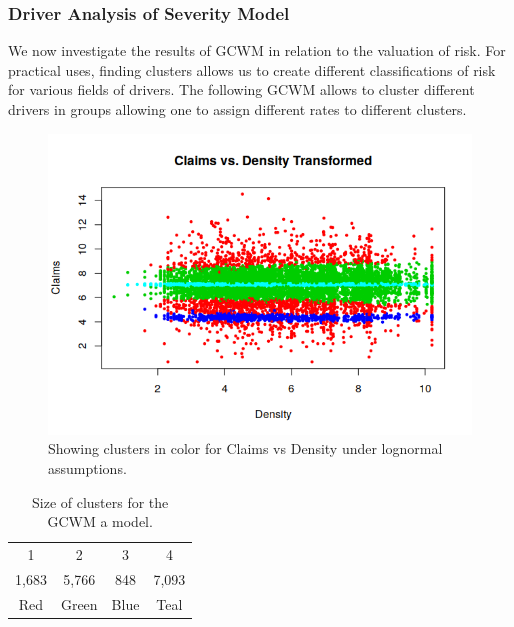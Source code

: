\documentclass[11pt,letterpaper]{article}
\numberwithin{equation}{section}
\numberwithin{equation}{section}
\numberwithin{equation}{section}
\begin{document}
\subsubsection{Driver Analysis of Severity Model}

	We now investigate the results of GCWM in relation to the valuation of risk. For practical uses, finding clusters allows us to create different classifications of risk for various fields of drivers. The following GCWM allows to cluster different drivers in groups allowing one to assign different rates to different clusters. 
\begin{figure}[!htb]
\begin{center}
\includegraphics[scale=0.83]{claims_v_density.png}
\end{center}
\caption{Showing clusters in color for Claims vs Density under lognormal assumptions.}
\label{fig:vet1}
\end{figure}
\begin{table}[!htb]
\centering
\caption{Size of clusters for the GCWM a model.}
\label{table:sizeSev}
\begin{tabular}{cccc}
\hline\hline 
1   & 2  &  3   & 4    \\
1,683 & 5,766 & 848 & 7,093 \\
Red & Green & Blue & Teal \\
\hline\hline
\end{tabular}
\end{table}
\end{document}
